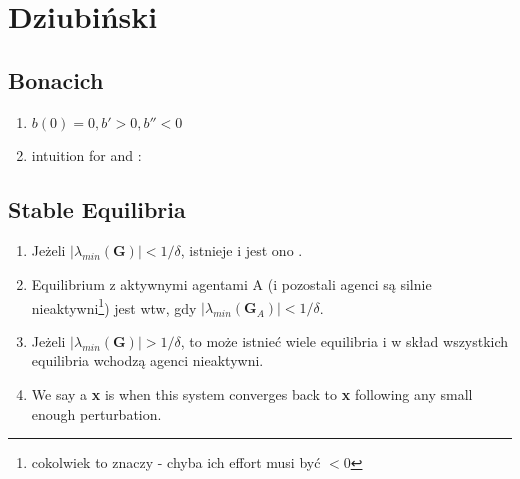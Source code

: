 \section{Dziubiński}

\subsection{Bonacich}


\begin{enumerate}
  \item
    $
    b(0) = 0,
    b' > 0,
    b'' < 0
    $

  \item
    intuition for
    and
    :

\end{enumerate}

\subsection{Stable Equilibria}

\begin{enumerate}
 \item Jeżeli $|\lambda_{min}(\textbf{G})| < 1/\delta$, istnieje  i jest ono .
 \item Equilibrium z aktywnymi agentami A (i pozostali agenci są silnie nieaktywni\footnote{cokolwiek to znaczy - chyba ich effort musi być $< 0$}) jest  wtw, gdy  $|\lambda_{min}(\textbf{G}_{A})| < 1/\delta$.
 \item Jeżeli $|\lambda_{min}(\textbf{G})| > 1/\delta$, to może istnieć wiele equilibria i w skład wszystkich equilibria wchodzą agenci nieaktywni.
 \item We say a  \textbf{x} is  when this system converges back to \textbf{x} following any small enough perturbation.
\end{enumerate}

